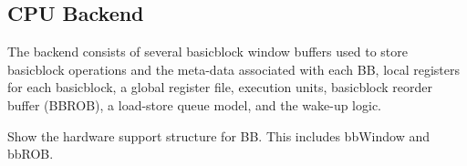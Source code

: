 \subsection{CPU Backend}
\label{sec:cpu_backend}

The backend consists of several basicblock window buffers used to store
basicblock operations and the meta-data associated with each BB, local registers
for each basicblock, a global register file, execution units, basicblock reorder
buffer (BBROB), a load-store queue model, and the wake-up logic.

Show the hardware support structure for BB. This includes bbWindow and bbROB.



